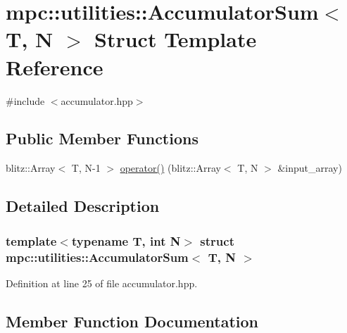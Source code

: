 \hypertarget{structmpc_1_1utilities_1_1_accumulator_sum}{}\section{mpc\+:\+:utilities\+:\+:Accumulator\+Sum$<$ T, N $>$ Struct Template Reference}
\label{structmpc_1_1utilities_1_1_accumulator_sum}


{\ttfamily \#include $<$accumulator.\+hpp$>$}

\subsection*{Public Member Functions}
\begin{DoxyCompactItemize}
\item 
blitz\+::\+Array$<$ T, N-\/1 $>$ \mbox{\hyperlink{structmpc_1_1utilities_1_1_accumulator_sum_afe897dea438bd648a423b3273f1ab54a}{operator()}} (blitz\+::\+Array$<$ T, N $>$ \&input\+\_\+array)
\end{DoxyCompactItemize}


\subsection{Detailed Description}
\subsubsection*{template$<$typename T, int N$>$\newline
struct mpc\+::utilities\+::\+Accumulator\+Sum$<$ T, N $>$}



Definition at line 25 of file accumulator.\+hpp.



\subsection{Member Function Documentation}
\mbox{\label{structmpc_1_1utilities_1_1_accumulator_sum_afe897dea438bd648a423b3273f1ab54a}} 

